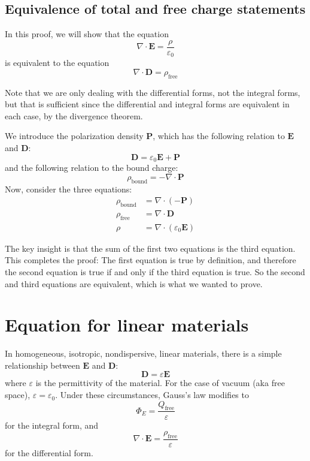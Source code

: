 \documentclass[a4paper]{article}
\begin{document}
\subsection{Equivalence of total and free charge statements}
\begin{mdframed}[%
    style=mystyle,%
    frametitle={Proof that the formulations of Gauss's law in terms of free charge are equivalent to the formulations involving total charge.}]

In this proof, we will show that the equation 
\[
    \nabla \cdot \mathbf{E} = \frac{\rho}{\varepsilon_0}
\]
is equivalent to the equation 
\[
    \nabla \cdot \mathbf{D} = \rho_\text{free}
\]

Note that we are only dealing with the differential forms, not the integral forms, but that is sufficient since the differential and integral forms are equivalent in each case, by the divergence theorem. 

We introduce the polarization density \(\mathbf{P}\), which has the following relation to \(\mathbf{E}\) and \(\mathbf{D}\): 
\[
    \mathbf{D} = \varepsilon_0\mathbf{E} + \mathbf{P}
\]
and the following relation to the bound charge:
\[
    \rho_\text{bound} = -\nabla \cdot \mathbf{P}
\]
Now, consider the three equations: 
\begin{align*}
    \rho_\text{bound} &= \nabla \cdot ( - \mathbf{P})\\
    \rho_\text{free}  &= \nabla \cdot \mathbf{D} \\
    \rho              &= \nabla \cdot (\varepsilon_0\mathbf{E})
\end{align*}

The key insight is that the sum of the first two equations is the third equation. This completes the proof: The first equation is true by definition, and therefore the second equation is true if and only if the third equation is true. So the second and third equations are equivalent, which is what we wanted to prove. 
\end{mdframed}

\section{Equation for linear materials}
In homogeneous, isotropic, nondispersive, linear materials, there is a simple relationship between \(\mathbf{E}\) and \(\mathbf{D}\):
\[
    \mathbf{D} = \varepsilon\mathbf{E}
\]
where \(\varepsilon\) is the permittivity of the material. For the case of vacuum (aka free space), \(\varepsilon = \varepsilon_0\). Under these circumstances, Gauss's law modifies to 
\[
    \Phi_E = \frac{Q_\text{free}}{\varepsilon}
\]
for the integral form, and
\[
    \nabla \cdot \mathbf{E} = \frac{\rho_\text{free}}{\varepsilon}
\]
for the differential form.
\end{document}
